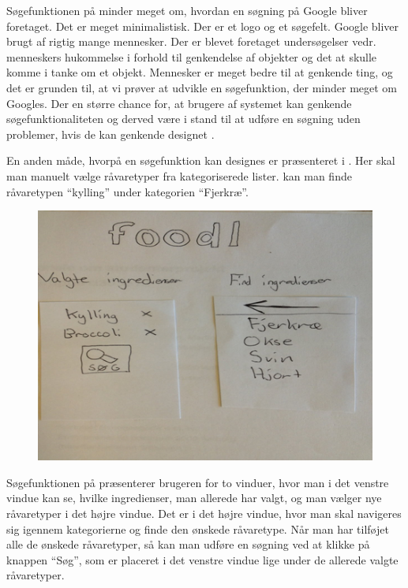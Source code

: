 Søgefunktionen på  minder meget om, hvordan en søgning på \fx Google bliver foretaget. Det er meget minimalistisk. Der er et logo og et søgefelt. Google bliver brugt af rigtig mange mennesker. Der er blevet foretaget undersøgelser vedr. menneskers hukommelse i forhold til genkendelse af objekter og det at skulle komme i tanke om et objekt. Mennesker er meget bedre til at genkende ting, og det er grunden til, at vi prøver at udvikle en søgefunktion, der minder meget om Googles. Der en større chance for, at brugere af systemet kan genkende søgefunktionaliteten og derved være i stand til at udføre en søgning uden problemer, hvis de kan genkende designet \cite[p. ~340]{deb}.

En anden måde, hvorpå en søgefunktion kan designes er præsenteret i . Her skal man manuelt vælge råvaretyper fra kategoriserede lister. \Fx kan man finde råvaretypen ``kylling'' under kategorien ``Fjerkræ''.

\begin{figure}[H]
	\centering
	\includegraphics[scale=0.7]{billeder/prototyper/prototype1b.png}
	\label{fig:prototype1bdesign}
\end{figure}

Søgefunktionen på  præsenterer brugeren for to vinduer, hvor man i det venstre vindue kan se, hvilke ingredienser, man allerede har valgt, og man vælger nye råvaretyper i det højre vindue. Det er i det højre vindue, hvor man skal navigeres sig igennem kategorierne og finde den ønskede råvaretype. Når man har tilføjet alle de ønskede råvaretyper, så kan man udføre en søgning ved at klikke på knappen ``Søg'', som er placeret i det venstre vindue lige under de allerede valgte råvaretyper.


